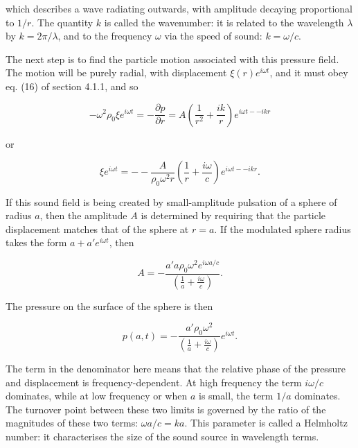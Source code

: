   \noindent{}which describes a wave radiating outwards, with amplitude decaying 
  proportional to $1/r$. The quantity $k$ is called the wavenumber: it is 
  related to the wavelength $\lambda$ by $k=2 \pi /\lambda$, and to the 
  frequency $\omega$ via the speed of sound: $k=\omega /c$. 

  The next step is to find the particle motion associated with this pressure 
  field. The motion will be purely radial, with displacement $\xi(r) e^{i 
  \omega t}$, and it must obey eq. (16) of section 4.1.1, and so 

  \begin{equation*}- \omega^2 \rho_0 \xi e^{i \omega t} = -\frac{\partial 
  p}{\partial r} = A\left( \frac{1}{r^2} + \frac{ik}{r}\right) e^{i\omega t -- 
  ikr} \tag{6}\end{equation*} 

  \noindent{}or 

  \begin{equation*}\xi e^{i \omega t} = -- \frac{A}{\rho_0 \omega^2 r} \left( 
  \frac{1}{r} +\frac{i \omega}{c} \right) e^{i\omega t -- ikr} . 
  \tag{7}\end{equation*} 

  If this sound field is being created by small-amplitude pulsation of a sphere 
  of radius $a$, then the amplitude $A$ is determined by requiring that the 
  particle displacement matches that of the sphere at $r=a$. If the modulated 
  sphere radius takes the form $a+a' e^{i \omega t}$, then 

  \begin{equation*}A=-\dfrac{a' a \rho_0 \omega^2 e^{i \omega a/c}}{\left( 
  \frac{1}{a} +\frac{i \omega}{c} \right)} . \tag{8}\end{equation*} 

  The pressure on the surface of the sphere is then 

  \begin{equation*}p(a,t)=-\dfrac{a' \rho_0 \omega^2}{\left( \frac{1}{a} 
  +\frac{i \omega}{c} \right)} e^{i \omega t}. \tag{9}\end{equation*} 

  The term in the denominator here means that the relative phase of the 
  pressure and displacement is frequency-dependent. At high frequency the term 
  $i \omega /c$ dominates, while at low frequency or when $a$ is small, the 
  term $1/a$ dominates. The turnover point between these two limits is governed 
  by the ratio of the magnitudes of these two terms: $\omega a/c = ka$. This 
  parameter is called a Helmholtz number: it characterises the size of the 
  sound source in wavelength terms. 


